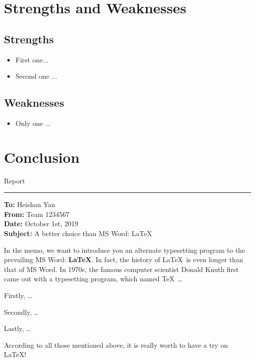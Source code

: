 \documentclass[12pt]{article}  %
\begin{document}
\section{Strengths and Weaknesses}
\subsection{Strengths}
\begin{itemize}
    \item First one...
    \item Second one ...
\end{itemize}

\subsection{Weaknesses}
\begin{itemize}
    \item Only one ...
 \end{itemize}

\section{Conclusion}


\begin{letter}{Report}
\noindent\rule[0.25\baselineskip]{\textwidth}{2pt} 
\begin{flushleft}  %
\textbf{To:} Heishan Yan\\
\textbf{From:} Team 1234567\\
\textbf{Date:} October 1st, 2019\\
\textbf{Subject:} A better choice than MS Word: \LaTeX
\end{flushleft}

In the memo, we want to introduce you an alternate typesetting program to the prevailing MS Word: \textbf{\LaTeX}. In fact, the history of \LaTeX\ is even longer than that of MS Word. In 1970s, the famous computer scientist Donald Knuth first came out with a typesetting program, which named \TeX\ \ldots

Firstly, \ldots

Secondly, \ldots

Lastly, \ldots

According to all those mentioned above, it is really worth to have a try on \LaTeX! 
\end{letter}
\end{document}
